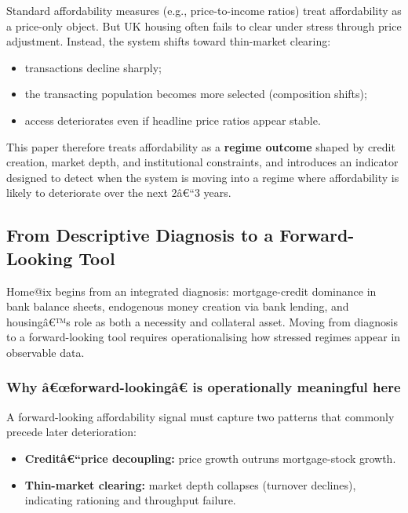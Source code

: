 Standard affordability measures (e.g., price-to-income ratios) treat
affordability as a price-only object. But UK housing often fails to
clear under stress through price adjustment. Instead, the system shifts
toward thin-market clearing:

\begin{itemize}
\tightlist
\item
  transactions decline sharply;
\item
  the transacting population becomes more selected (composition shifts);
\item
  access deteriorates even if headline price ratios appear stable.
\end{itemize}

This paper therefore treats affordability as a \textbf{regime outcome}
shaped by credit creation, market depth, and institutional constraints,
and introduces an indicator designed to detect when the system is moving
into a regime where affordability is likely to deteriorate over the next
2â€``3 years.

\subsection{From Descriptive Diagnosis to a Forward-Looking
Tool}\label{from-descriptive-diagnosis-to-a-forward-looking-tool}

Home@ix begins from an integrated diagnosis: mortgage-credit dominance
in bank balance sheets, endogenous money creation via bank lending, and
housingâ€™s role as both a necessity and collateral asset. Moving from
diagnosis to a forward-looking tool requires operationalising how
stressed regimes appear in observable data.

\subsubsection{Why â€œforward-lookingâ€ is operationally meaningful
here}\label{why-uxe2ux153forward-lookinguxe2-is-operationally-meaningful-here}

A forward-looking affordability signal must capture two patterns that
commonly precede later deterioration:

\begin{itemize}
\tightlist
\item
  \textbf{Creditâ€``price decoupling:} price growth outruns
  mortgage-stock growth.
\item
  \textbf{Thin-market clearing:} market depth collapses (turnover
  declines), indicating rationing and throughput failure.
\end{itemize}

